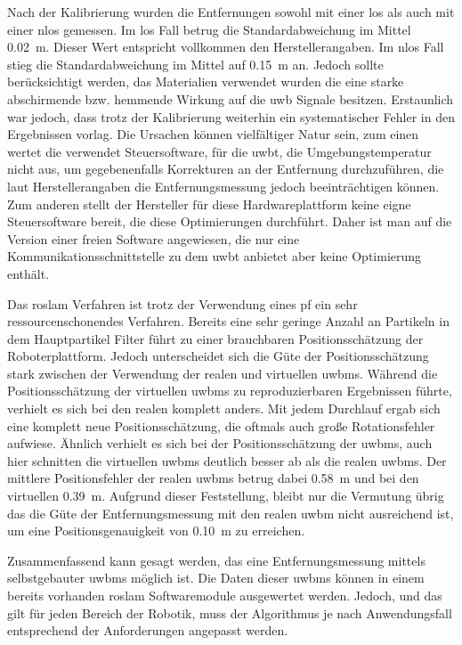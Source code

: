 Nach der Kalibrierung wurden die Entfernungen sowohl mit einer \gls{los} als auch mit einer \gls{nlos} gemessen. Im \gls{los} Fall betrug die Standardabweichung im Mittel \SI{0.02}{\meter}. Dieser Wert entspricht vollkommen den Herstellerangaben. Im \gls{nlos} Fall stieg die Standardabweichung im Mittel auf \SI{0.15}{\meter} an. Jedoch sollte berücksichtigt werden, das Materialien verwendet wurden die eine starke abschirmende bzw. hemmende Wirkung auf die \gls{uwb} Signale besitzen. Erstaunlich war jedoch, dass trotz der Kalibrierung weiterhin ein systematischer Fehler in den Ergebnissen vorlag. Die Ursachen können vielfältiger Natur sein, zum einen wertet die verwendet Steuersoftware, für die \gls{uwbt}, die Umgebungstemperatur nicht aus, um gegebenenfalls Korrekturen an der Entfernung durchzuführen, die laut Herstellerangaben die Entfernungsmessung jedoch beeinträchtigen können. Zum anderen stellt der Hersteller für diese Hardwareplattform keine eigne Steuersoftware bereit, die diese Optimierungen durchführt. Daher ist man auf die Version einer freien Software angewiesen, die nur eine Kommunikationsschnittstelle zu dem \gls{uwbt} anbietet aber keine Optimierung enthält.

Das \gls{roslam} Verfahren ist trotz der Verwendung eines \gls{pf} ein sehr ressourcenschonendes Verfahren. Bereits eine sehr geringe Anzahl an Partikeln in dem Hauptpartikel Filter führt zu einer brauchbaren Positionsschätzung der Roboterplattform. Jedoch unterscheidet sich die Güte der Positionsschätzung stark zwischen der Verwendung der realen und virtuellen \glspl{uwbm}. Während die Positionsschätzung der virtuellen \glspl{uwbm} zu reproduzierbaren Ergebnissen führte, verhielt es sich bei den realen  komplett anders. Mit jedem Durchlauf ergab sich eine komplett neue Positionsschätzung, die oftmals auch große Rotationsfehler aufwiese. Ähnlich verhielt es sich bei der Positionsschätzung der \glspl{uwbm}, auch hier schnitten die virtuellen \glspl{uwbm} deutlich besser ab als die realen \glspl{uwbm}. Der mittlere Positionsfehler der realen \glspl{uwbm} betrug dabei \SI{0.58}{\meter} und bei den virtuellen \SI{0.39}{\meter}. Aufgrund dieser Feststellung, bleibt nur die Vermutung übrig das die Güte der Entfernungsmessung mit den realen \gls{uwbm} nicht ausreichend ist, um eine Positionsgenauigkeit von \SI{0.10}{\meter} zu erreichen.

Zusammenfassend kann gesagt werden, das eine Entfernungsmessung mittels selbstgebauter \glspl{uwbm} möglich ist. Die Daten dieser \glspl{uwbm} können in einem bereits vorhanden \gls{roslam} Softwaremodule ausgewertet werden. Jedoch, und das gilt für jeden Bereich der Robotik, muss der Algorithmus je nach Anwendungsfall entsprechend der Anforderungen angepasst werden.

